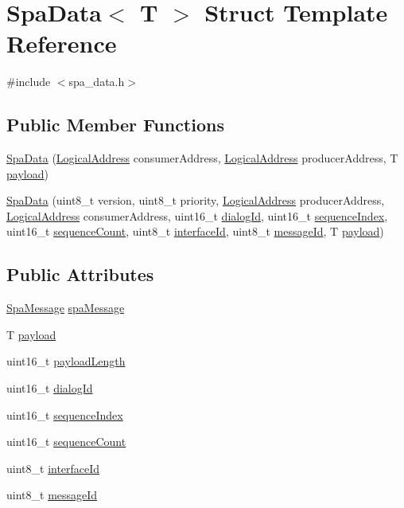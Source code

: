\hypertarget{structSpaData}{}\section{Spa\+Data$<$ T $>$ Struct Template Reference}
\label{structSpaData}


{\ttfamily \#include $<$spa\+\_\+data.\+h$>$}

\subsection*{Public Member Functions}
\begin{DoxyCompactItemize}
\item 
\hyperlink{structSpaData_a5039d8b49c2afb236fdaacc27341f8ce}{Spa\+Data} (\hyperlink{structLogicalAddress}{Logical\+Address} consumer\+Address, \hyperlink{structLogicalAddress}{Logical\+Address} producer\+Address, T \hyperlink{structSpaData_a615546d992c6f12e9ac6f1f2db202be7}{payload})
\item 
\hyperlink{structSpaData_ae9bf86197e7b21b5a37a1e1b2de76320}{Spa\+Data} (uint8\+\_\+t version, uint8\+\_\+t priority, \hyperlink{structLogicalAddress}{Logical\+Address} producer\+Address, \hyperlink{structLogicalAddress}{Logical\+Address} consumer\+Address, uint16\+\_\+t \hyperlink{structSpaData_ac0b96669c8271ace6706c70008c59981}{dialog\+Id}, uint16\+\_\+t \hyperlink{structSpaData_af73ab34cf6e29508bc8531a7846e39ef}{sequence\+Index}, uint16\+\_\+t \hyperlink{structSpaData_a8942336c812cd66dabc7f45fd7d43642}{sequence\+Count}, uint8\+\_\+t \hyperlink{structSpaData_a4058e924739e721a3a006db80e609576}{interface\+Id}, uint8\+\_\+t \hyperlink{structSpaData_a3c59b61ef43032b50c40eea6807e074f}{message\+Id}, T \hyperlink{structSpaData_a615546d992c6f12e9ac6f1f2db202be7}{payload})
\end{DoxyCompactItemize}
\subsection*{Public Attributes}
\begin{DoxyCompactItemize}
\item 
\hyperlink{structSpaMessage}{Spa\+Message} \hyperlink{structSpaData_a92344b63fb9ae2e080c30d4810020170}{spa\+Message}
\item 
T \hyperlink{structSpaData_a615546d992c6f12e9ac6f1f2db202be7}{payload}
\item 
uint16\+\_\+t \hyperlink{structSpaData_a9a13479cc5d5fe7d648a4676f558bd5d}{payload\+Length}
\item 
uint16\+\_\+t \hyperlink{structSpaData_ac0b96669c8271ace6706c70008c59981}{dialog\+Id}
\item 
uint16\+\_\+t \hyperlink{structSpaData_af73ab34cf6e29508bc8531a7846e39ef}{sequence\+Index}
\item 
uint16\+\_\+t \hyperlink{structSpaData_a8942336c812cd66dabc7f45fd7d43642}{sequence\+Count}
\item 
uint8\+\_\+t \hyperlink{structSpaData_a4058e924739e721a3a006db80e609576}{interface\+Id}
\item 
uint8\+\_\+t \hyperlink{structSpaData_a3c59b61ef43032b50c40eea6807e074f}{message\+Id}
\end{DoxyCompactItemize}


